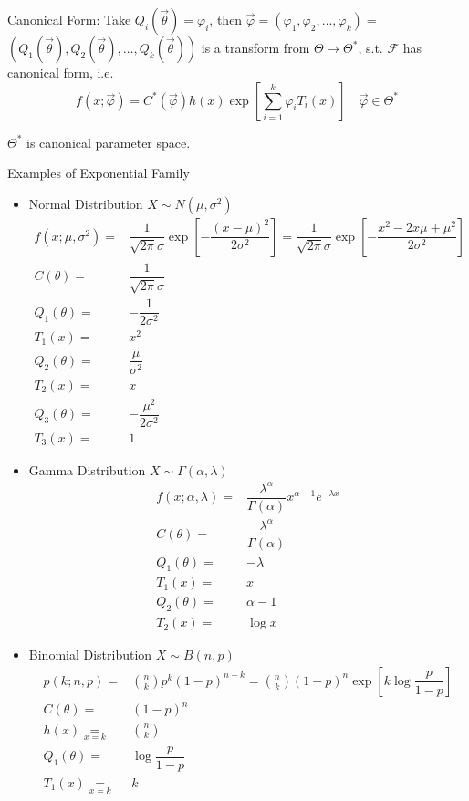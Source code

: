     Canonical Form: Take $Q_i(\vec{\theta})=\varphi_i$, then $\vec{\varphi}=(\varphi_1,\varphi_2,\ldots,\varphi_k)=$$(Q_1(\vec{\theta}),Q_2(\vec{\theta}),\ldots,Q_k(\vec{\theta}))$ is a transform from $\Theta\mapsto\Theta^*$, s.t. $\mathscr{F}$ has canonical form, i.e.
    \begin{equation}\label{EqaExponentialDistributionFamily}
        f(x;\vec{\varphi})=C^*(\vec{\varphi})h(x)   \exp\left[  \sum_{i=1}^k \varphi_i T_i(x) \right] \quad \vec{\varphi}\in\Theta^*
    \end{equation}

    $\Theta^*$ is canonical parameter space.

    
\begin{point}
    Examples of Exponential Family
\end{point}
\begin{itemize}[topsep=2pt,itemsep=0pt]
    \item Normal Distribution $ X\sim N(\mu ,\sigma ^2) $
    \begin{align}
        f(x;\mu ,\sigma ^2)=&\dfrac{1}{\sqrt{2\pi}\sigma }\exp\left[ -\dfrac{(x-\mu )^2}{2\sigma ^2} \right]=\dfrac{1}{\sqrt{2\pi}\sigma }\exp\left[ -\dfrac{x^2-2x\mu +\mu ^2}{2\sigma ^2} \right]\\
        C(\theta )=&\dfrac{1}{\sqrt{2\pi}\sigma }\\
        Q_1(\theta )=&-\dfrac{1}{2\sigma ^2}\\
        T_1(x)=&x^2\\
        Q_2(\theta )=&\dfrac{\mu }{\sigma ^2}\\
        T_2(x)=&x\\
        Q_3(\theta )=&-\dfrac{\mu ^2}{2\sigma ^2}\\
        T_3(x)=&1
    \end{align}
    \item Gamma Distribution $ X\sim \Gamma (\alpha ,\lambda ) $
    \begin{align}
        f(x;\alpha ,\lambda )=&\dfrac{\lambda ^\alpha }{\Gamma (\alpha )}x^{\alpha -1}e^{-\lambda x}\\
        C(\theta )=&\dfrac{\lambda ^\alpha }{\Gamma (\alpha )}\\
        Q_1(\theta )=&-\lambda \\
        T_1(x)=&x\\
        Q_2(\theta )=&\alpha -1\\
        T_2(x)=&\log x
    \end{align}
    \item Binomial Distribution $ X\sim B(n,p) $
    \begin{align}
        p(k;n,p)=&\binom{n}{k}p^k(1-p)^{n-k}=\binom{n}{k}(1-p)^n\exp\left[ k\log\dfrac{p }{1-p} \right]\\
        C(\theta )=&(1-p)^n\\
        h(x)\mathop{=}\limits_{x=k} &\binom{n}{k}\\
        Q_1(\theta )=&\log\dfrac{p}{1-p}\\
        T_1(x)\mathop{=}\limits_{x=k}&k 
    \end{align}
    
    
\end{itemize}

